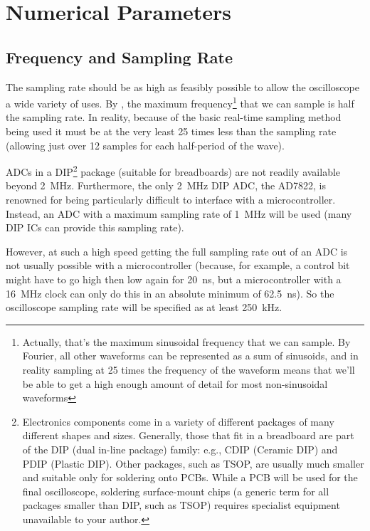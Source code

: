\section{Numerical Parameters}
\label{sec:numericalParameters}

\subsection*{Frequency and Sampling Rate}

The sampling rate should be as high as feasibly possible to allow the
oscilloscope a wide variety of uses. By \textcite{ShanonNyquist}, the maximum
frequency\footnote{Actually, that's the maximum sinusoidal frequency that we can
sample. By Fourier, all other waveforms can be represented as a sum of
sinusoids, and in reality sampling at 25 times the frequency of the waveform
means that we'll be able to get a high enough amount of detail for most
non-sinusoidal waveforms} that we can sample is half the sampling rate. In
reality, because of the basic real-time sampling method being used it must be at
the very least 25 times less than the sampling rate (allowing just over 12
samples for each half-period of the wave).

ADCs in a DIP\footnote{Electronics components come in a variety of different
packages of many different shapes and sizes. Generally, those that fit in a
breadboard are part of the DIP (dual in-line package) family: e.g., CDIP
(Ceramic DIP) and PDIP (Plastic DIP). Other packages, such as TSOP, are usually
much smaller and suitable only for soldering onto PCBs. While a PCB will be used
for the final oscilloscope, soldering surface-mount chips (a generic term for
all packages smaller than DIP, such as TSOP) requires specialist equipment
unavailable to your author.} package (suitable for breadboards) are not readily
available beyond \SI{2}{\MHz}. Furthermore, the only \SI{2}{\MHz} DIP ADC, the
AD7822, is renowned for being particularly difficult to interface with a
microcontroller.  Instead, an ADC with a maximum sampling rate of \SI{1}{\MHz}
will be used (many DIP ICs can provide this sampling rate).

However, at such a high speed getting the full sampling rate out of an ADC is
not usually possible with a microcontroller (because, for example, a control bit
might have to go high then low again for \SI{20}{\ns}, but a microcontroller
with a \SI{16}{\MHz} clock can only do this in an absolute minimum of
\SI{62.5}{\ns}). So the oscilloscope sampling rate will be specified as at least
\SI{250}{\kHz}.

